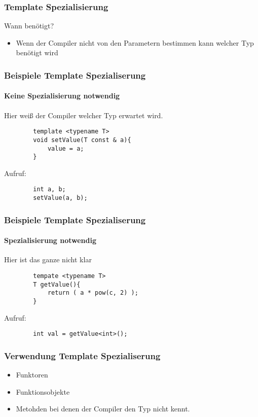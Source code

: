 \documentclass{beamer}
\begin{document}
\begin{frame}[<+->]\frametitle{Template Spezialisierung}
    \pause
    Wann benötigt?
    \pause
    \begin{itemize}
    	\item Wenn der Compiler nicht von den Parametern bestimmen kann welcher Typ benötigt wird
    \end{itemize}
\end{frame}

\begin{frame}[fragile]\frametitle{Beispiele Template Spezialiserung}
	\framesubtitle{Keine Spezialisierung notwendig}
	\pause    
    Hier weiß der Compiler welcher Typ erwartet wird.
    \begin{lstlisting}
    	template <typename T>
    	void setValue(T const & a){
    		value = a;
    	}
    \end{lstlisting}

    \pause
    Aufruf:
    \begin{lstlisting}
    	int a, b;
    	setValue(a, b);
    \end{lstlisting}
\end{frame}

\begin{frame}[fragile]\frametitle{Beispiele Template Spezialiserung}
	\framesubtitle{Spezialisierung notwendig}
    \pause
    Hier ist das ganze nicht klar
    \begin{lstlisting}
    	tempate <typename T>
    	T getValue(){
    		return ( a * pow(c, 2) );
    	}
    \end{lstlisting}

    \pause
    Aufruf:
    \begin{lstlisting}
    	int val = getValue<int>();
    \end{lstlisting}
\end{frame}

\begin{frame}[<+->]\frametitle{Verwendung Template Spezialiserung}
    \begin{itemize}
    	\item Funktoren
    	\item Funktionsobjekte
    	\item Metohden bei denen der Compiler den Typ nicht kennt.
    \end{itemize}


\end{frame}
\end{document}
